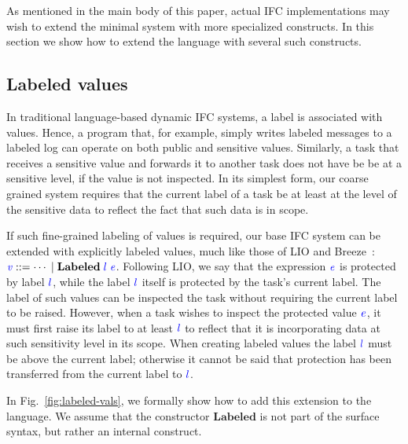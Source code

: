 \documentclass{llncs}
\newcommand{\Varid}[1]{\mathit{#1}}
\begin{document}
As mentioned in the main body of this paper,
actual IFC implementations
may wish to extend the minimal system with more specialized
constructs.
In this section we show how to extend the language with several such
constructs.


\subsection{Labeled values}
In traditional language-based dynamic IFC systems, a label is
associated with values.
Hence, a program that, for example, simply writes labeled messages to
a labeled log can operate on both public and sensitive values.
Similarly, a task that receives a sensitive value and forwards it
to another task does not have be be at a sensitive level, if the
value is not inspected.
In its simplest form, our coarse grained system requires that the
current label of a task be at least at the level of the sensitive data
to reflect the fact that such data is in scope.

If such fine-grained labeling of values is required, our base IFC
system can be extended with explicitly labeled
values, much like those of LIO and
Breeze~\cite{lio, Hritcu:2013:YIB:2497621.2498098}: \ensuremath{\ifc{\Varid{v}}\Coloneqq\cdots\;|\;\mathbf{Labeled}\;\ifc{l}\;\ifc{\Varid{e}}}.
Following LIO, we say that the expression \ensuremath{\ifc{\Varid{e}}} is protected by label \ensuremath{\ifc{l}},
while the label \ensuremath{\ifc{l}} itself is protected by the task's current label.
The label of such values can be inspected the task without
requiring the current label to be raised.
However, when a task wishes to inspect the protected value \ensuremath{\ifc{\Varid{e}}}, it
must first raise its label to at least \ensuremath{\ifc{l}} to reflect that it is
incorporating data at such sensitivity level in its scope.
When creating labeled values the label \ensuremath{\ifc{l}} must be above
the current label; otherwise it cannot be said that protection has
been transferred from the current label to \ensuremath{\ifc{l}}.


In Fig.~\ref{fig:labeled-vals}, we formally show how to add this
extension to the language.
We assume that the constructor \ensuremath{\mathbf{Labeled}} is not part
of the surface syntax, but rather an internal construct.
\end{document}
